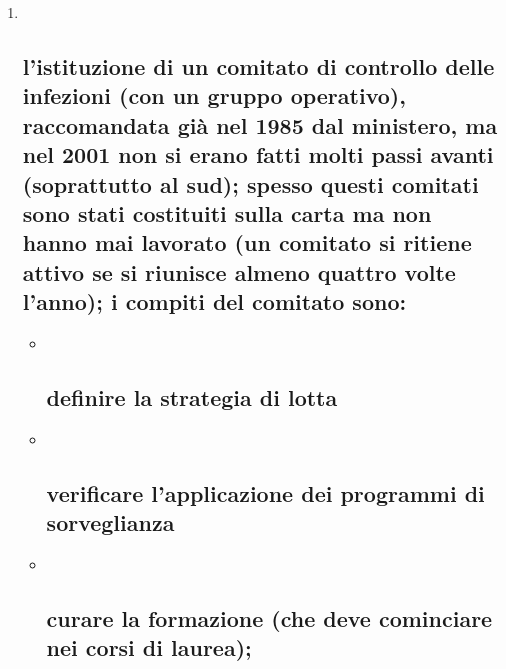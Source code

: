 \documentclass[]{article}
\begin{document}
\begin{enumerate}
\def\labelenumi{\arabic{enumi}.}
\item ~
  \subsection{\texorpdfstring{l'istituzione di un \textbf{comitato di
  controllo delle infezioni} (con un gruppo operativo), raccomandata già
  nel 1985 dal ministero, ma nel 2001 non si erano fatti molti passi
  avanti (soprattutto al sud); spesso questi comitati sono stati
  costituiti sulla carta ma non hanno mai lavorato (un comitato si
  ritiene attivo se si riunisce almeno quattro volte l'anno); i compiti
  del comitato
  sono:}{l'istituzione di un comitato di controllo delle infezioni (con un gruppo operativo), raccomandata già nel 1985 dal ministero, ma nel 2001 non si erano fatti molti passi avanti (soprattutto al sud); spesso questi comitati sono stati costituiti sulla carta ma non hanno mai lavorato (un comitato si ritiene attivo se si riunisce almeno quattro volte l'anno); i compiti del comitato sono:}}\label{listituzione-di-un-comitato-di-controllo-delle-infezioni-con-un-gruppo-operativo-raccomandata-giuxe0-nel-1985-dal-ministero-ma-nel-2001-non-si-erano-fatti-molti-passi-avanti-soprattutto-al-sud-spesso-questi-comitati-sono-stati-costituiti-sulla-carta-ma-non-hanno-mai-lavorato-un-comitato-si-ritiene-attivo-se-si-riunisce-almeno-quattro-volte-lanno-i-compiti-del-comitato-sono}

  \begin{itemize}
  \item ~
    \subsection{definire la strategia di
    lotta}\label{definire-la-strategia-di-lotta}
  \item ~
    \subsection{verificare l'applicazione dei programmi di
    sorveglianza}\label{verificare-lapplicazione-dei-programmi-di-sorveglianza}
  \item ~
    \subsection{curare la formazione (che deve cominciare nei corsi di
    laurea);}\label{curare-la-formazione-che-deve-cominciare-nei-corsi-di-laurea}
  \end{itemize}
\end{enumerate}
\end{document}
